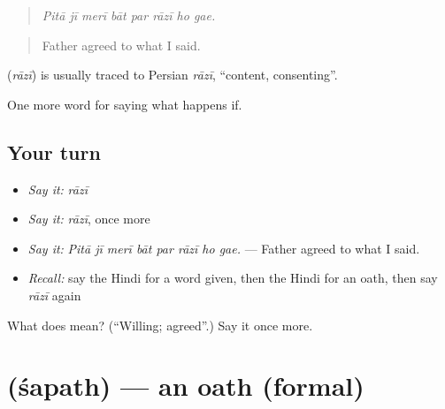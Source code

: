 \begin{quote}
       
\end{quote}

\begin{quote}
\emph{Pitā jī merī bāt par rāzī ho gae.}
\end{quote}

\begin{quote}
Father agreed to what I said.
\end{quote}

\begin{cousinweb}
\textbf{} (\emph{rāzī}) is usually traced to Persian \emph{rāzī}, \textquotedblleft{}content, consenting\textquotedblright{}.
\end{cousinweb}

\begin{grammarlens}[title={What you've built}]
One more word for saying what happens if.
\end{grammarlens}

\subsection*{Your turn}
\begin{itemize}
\raggedright
  \item \emph{Say it:} \emph{rāzī}
  \item \emph{Say it:} \emph{rāzī}, once more
  \item \emph{Say it:} \emph{Pitā jī merī bāt par rāzī ho gae.} — Father agreed to what I said.
  \item \emph{Recall:} say the Hindi for a word given, then the Hindi for an oath, then say \emph{rāzī} again
\end{itemize}

\begin{tcolorbox}[breakable,colback=teal!4,colframe=teal!35!black,title={Before you move on}]
What does  mean? (\textquotedblleft{}Willing; agreed\textquotedblright{}.) Say it once more.
\end{tcolorbox}
\section[\texorpdfstring{\hi{शपथ} (śapath)}{शपथ (śapath)}]{ (śapath) — an oath (formal)}

\label{lesson:HI-C543-sapath}



